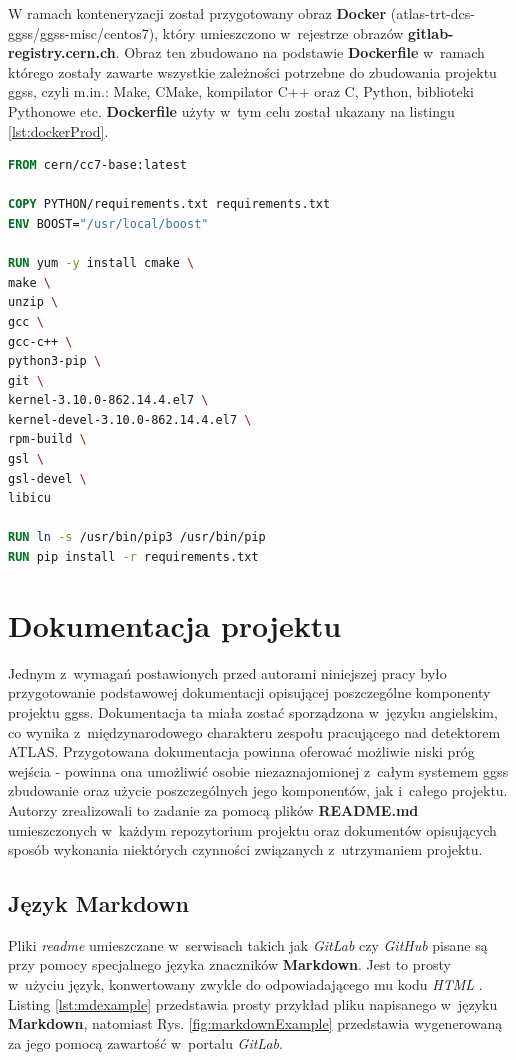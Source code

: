 \newpage

W ramach konteneryzacji został przygotowany obraz \textbf{Docker} (atlas-trt-dcs-ggss/ggss-misc/centos7), który umieszczono w~rejestrze obrazów \textbf{gitlab-registry.cern.ch}. Obraz ten zbudowano na podstawie \textbf{Dockerfile} w~ramach którego zostały zawarte wszystkie zależności potrzebne do zbudowania projektu \gls*{ggss}, czyli m.in.: Make, CMake, kompilator C++ oraz C, Python, biblioteki Pythonowe etc. \textbf{Dockerfile} użyty w~tym celu został ukazany na listingu \ref{lst:dockerProd}.

\begin{lstlisting}[language=Dockerfile, caption={\textbf{Dockerfile} dla projektu \gls*{ggss}}, label={lst:dockerProd}]
FROM cern/cc7-base:latest

COPY PYTHON/requirements.txt requirements.txt
ENV BOOST="/usr/local/boost"

RUN yum -y install cmake \
make \
unzip \
gcc \
gcc-c++ \
python3-pip \
git \
kernel-3.10.0-862.14.4.el7 \
kernel-devel-3.10.0-862.14.4.el7 \
rpm-build \
gsl \
gsl-devel \
libicu

RUN ln -s /usr/bin/pip3 /usr/bin/pip
RUN pip install -r requirements.txt
\end{lstlisting}

\newpage
\section{Dokumentacja projektu}
Jednym z~wymagań postawionych przed autorami niniejszej pracy było przygotowanie podstawowej dokumentacji opisującej poszczególne komponenty projektu \gls*{ggss}. Dokumentacja ta miała zostać sporządzona w~języku angielskim, co wynika z~międzynarodowego charakteru zespołu pracującego nad detektorem ATLAS. Przygotowana dokumentacja powinna oferować możliwie niski próg wejścia - powinna ona umożliwić osobie niezaznajomionej z~całym systemem \gls*{ggss} zbudowanie oraz użycie poszczególnych jego komponentów, jak i~całego projektu. Autorzy zrealizowali to zadanie za pomocą plików \textbf{README.md} umieszczonych w~każdym repozytorium projektu oraz dokumentów opisujących sposób wykonania niektórych czynności związanych z~utrzymaniem projektu.

\subsection{Język Markdown}
Pliki \textit{readme} umieszczane w~serwisach takich jak \textit{GitLab} czy \textit{GitHub} pisane są przy pomocy specjalnego języka znaczników \textbf{Markdown}. Jest to prosty w~użyciu język, konwertowany zwykle do odpowiadającego mu kodu \textit{HTML} \cite{Markdown1}. Listing \ref{lst:mdexample} przedstawia prosty przykład pliku napisanego w~języku \textbf{Markdown}, natomiast Rys. \ref{fig:markdownExample} przedstawia wygenerowaną za jego pomocą zawartość w~portalu \textit{GitLab}.

